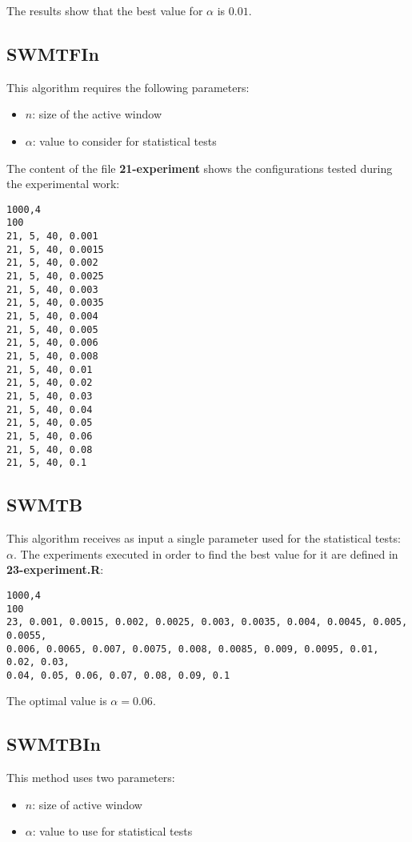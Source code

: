 \documentclass{article}
\begin{document}
The results show that the best value for $\alpha$ is $0.01$.

\subsection{SWMTFIn}

This algorithm requires the following parameters:

\begin{itemize}
\item $n$: size of the active window
\item $\alpha$: value to consider for statistical tests
\end{itemize}

The content of the file \textbf{21-experiment} shows the configurations
tested during the experimental work:

\begin{verbatim}
1000,4
100
21, 5, 40, 0.001
21, 5, 40, 0.0015
21, 5, 40, 0.002
21, 5, 40, 0.0025
21, 5, 40, 0.003
21, 5, 40, 0.0035
21, 5, 40, 0.004
21, 5, 40, 0.005
21, 5, 40, 0.006
21, 5, 40, 0.008
21, 5, 40, 0.01
21, 5, 40, 0.02
21, 5, 40, 0.03
21, 5, 40, 0.04
21, 5, 40, 0.05
21, 5, 40, 0.06
21, 5, 40, 0.08
21, 5, 40, 0.1
\end{verbatim}

\subsection{SWMTB}

This algorithm receives as input a single parameter used for the statistical
tests: $\alpha$. The experiments executed in order to find the best value
for it are defined in \textbf{23-experiment.R}:

\begin{verbatim}
1000,4
100
23, 0.001, 0.0015, 0.002, 0.0025, 0.003, 0.0035, 0.004, 0.0045, 0.005, 0.0055,
0.006, 0.0065, 0.007, 0.0075, 0.008, 0.0085, 0.009, 0.0095, 0.01, 0.02, 0.03,
0.04, 0.05, 0.06, 0.07, 0.08, 0.09, 0.1
\end{verbatim}

The optimal value is $\alpha=0.06$.

\subsection{SWMTBIn}

This method uses two parameters:

\begin{itemize}
\item $n$: size of active window
\item $\alpha$: value to use for statistical tests
\end{itemize}
\end{document}
